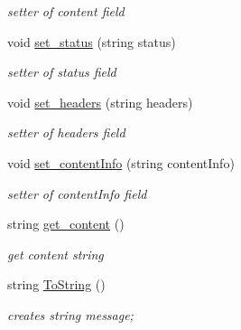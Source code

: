 \begin{DoxyCompactItemize}
\begin{DoxyCompactList}\small\item\em setter of content field \end{DoxyCompactList}\item 
void \hyperlink{classResponse_a0e60a923bc6d4a4235be99659fb86c44}{set\+\_\+status} (string status)\hypertarget{classResponse_a0e60a923bc6d4a4235be99659fb86c44}{}\label{classResponse_a0e60a923bc6d4a4235be99659fb86c44}

\begin{DoxyCompactList}\small\item\em setter of status field \end{DoxyCompactList}\item 
void \hyperlink{classResponse_a9fdca7bc43fed5013cea7fc9d758fcc6}{set\+\_\+headers} (string headers)\hypertarget{classResponse_a9fdca7bc43fed5013cea7fc9d758fcc6}{}\label{classResponse_a9fdca7bc43fed5013cea7fc9d758fcc6}

\begin{DoxyCompactList}\small\item\em setter of headers field \end{DoxyCompactList}\item 
void \hyperlink{classResponse_a3a3e9e237bf28e93c2e0980aba4486c8}{set\+\_\+content\+Info} (string content\+Info)\hypertarget{classResponse_a3a3e9e237bf28e93c2e0980aba4486c8}{}\label{classResponse_a3a3e9e237bf28e93c2e0980aba4486c8}

\begin{DoxyCompactList}\small\item\em setter of content\+Info field \end{DoxyCompactList}\item 
string \hyperlink{classResponse_a2865325ae8ff47265d3acdea92a439f5}{get\+\_\+content} ()\hypertarget{classResponse_a2865325ae8ff47265d3acdea92a439f5}{}\label{classResponse_a2865325ae8ff47265d3acdea92a439f5}

\begin{DoxyCompactList}\small\item\em get content string \end{DoxyCompactList}\item 
string \hyperlink{classResponse_a65879472be164ebbcf39a6f58310d42c}{To\+String} ()
\begin{DoxyCompactList}\small\item\em creates string message; \end{DoxyCompactList}\end{DoxyCompactItemize}


